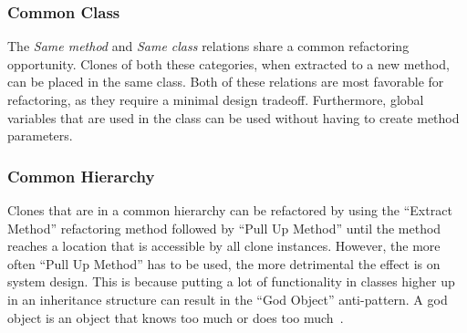 \documentclass[runningheads]{llncs}
\begin{document}


\subsubsection{Common Class}
The \textit{Same method} and \textit{Same class} relations share a common refactoring opportunity. Clones of both these categories, when extracted to a new method, can be placed in the same class. Both of these relations are most favorable for refactoring, as they require a minimal design tradeoff. Furthermore, global variables that are used in the class can be used without having to create method parameters.



\subsubsection{Common Hierarchy}
Clones that are in a common hierarchy can be refactored by using the ``Extract Method'' refactoring method followed by ``Pull Up Method'' until the method reaches a location that is accessible by all clone instances. However, the more often ``Pull Up Method'' has to be used, the more detrimental the effect is on system design. This is because putting a lot of functionality in classes higher up in an inheritance structure can result in the ``God Object'' anti-pattern. A god object is an object that knows too much or does too much~\cite{fowler2018refactoring}.
\end{document}
